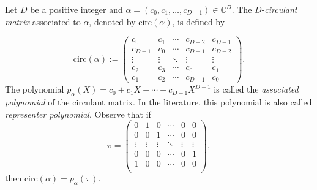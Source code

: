 Let $D$ be a positive integer and $\alpha=\left(c_{0},c_{1},\ldots,c_{D-1}\right)\in\mathbb{C}^{D}$.  The $D$-{\em circulant matrix} associated to $\alpha$, denoted by $\text{circ}(\alpha)$, is defined by


\begin{equation}
\text{circ}(\alpha):=\left(\begin{array}{ccccc}
c_{0} & c_{1} & \cdots & c_{D-2} & c_{D-1}\\
c_{D-1} & c_{0} & \cdots & c_{D-1} & c_{D-2}\\
\vdots & \vdots & \ddots & \vdots & \vdots\\
c_{2} & c_{3} & \cdots & c_{0} & c_{1}\\
c_{1} & c_{2} & \cdots & c_{D-1} & c_{0}
\end{array}\right).
\end{equation}
The polynomial $p_{\alpha}(X)=c_0+c_1 X+\cdots+ c_{D-1} X^{D-1}$ is called the {\em associated polynomial} of the circulant matrix.  In the literature, this polynomial is also called {\em representer polynomial}.
Observe that if
\begin{equation}
 \pi = \left(
\begin{array}{rrrrrr}
 0 & 1 & 0 & \cdots  & 0 & 0 \\
 0 & 0 & 1 & \cdots  & 0 & 0 \\
 \vdots & \vdots & \vdots & \ddots & \vdots & \vdots\\
 0 & 0 & 0 &  \cdots & 0 & 1 \\
 1 & 0 & 0 & \cdots & 0 & 0 \\
\end{array}
\right),
\end{equation}
then $\text{circ}(\alpha) = p_{\alpha}(\pi)$.

